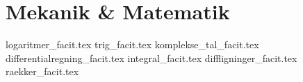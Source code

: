 \documentclass[crop=false, class=memoir]{standalone}
\begin{document}
\section{Mekanik \& Matematik}

{logaritmer_facit.tex}
{trig_facit.tex}
{komplekse_tal_facit.tex}
{differentialregning_facit.tex}
{integral_facit.tex}
{diffligninger_facit.tex}
{raekker_facit.tex}
\end{document}
